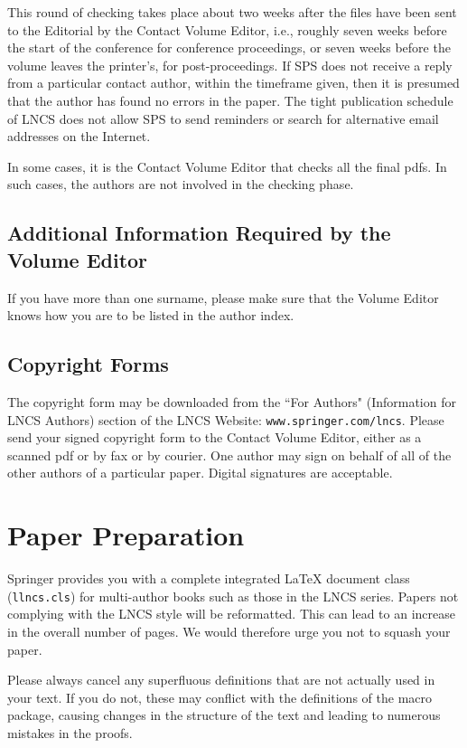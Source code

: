 \documentclass[runningheads,a4paper]{llncs}
\begin{document}
{This round of checking takes place about two weeks after the files have
been sent to the Editorial by the Contact Volume Editor, i.e., roughly
seven weeks before the start of the conference for conference
proceedings, or seven weeks before the volume leaves the printer's, for
post-proceedings. If SPS does not receive a reply from a particular
contact author, within the timeframe given, then it is presumed that the
author has found no errors in the paper. The tight publication schedule
of LNCS does not allow SPS to send reminders or search for alternative
email addresses on the Internet.

In some cases, it is the Contact Volume Editor that checks all the final
pdfs. In such cases, the authors are not involved in the checking phase.

\subsection{Additional Information Required by the Volume Editor}

If you have more than one surname, please make sure that the Volume Editor
knows how you are to be listed in the author index.

\subsection{Copyright Forms}

The copyright form may be downloaded from the ``For Authors"
(Information for LNCS Authors) section of the LNCS Website:
\texttt{www.springer.com/lncs}. Please send your signed copyright form
to the Contact Volume Editor, either as a scanned pdf or by fax or by
courier. One author may sign on behalf of all of the other authors of a
particular paper. Digital signatures are acceptable.

\section{Paper Preparation}

Springer provides you with a complete integrated \LaTeX{} document class
(\texttt{llncs.cls}) for multi-author books such as those in the LNCS
series. Papers not complying with the LNCS style will be reformatted.
This can lead to an increase in the overall number of pages. We would
therefore urge you not to squash your paper.

Please always cancel any superfluous definitions that are
not actually used in your text. If you do not, these may conflict with
the definitions of the macro package, causing changes in the structure
of the text and leading to numerous mistakes in the proofs.

}
\end{document}
